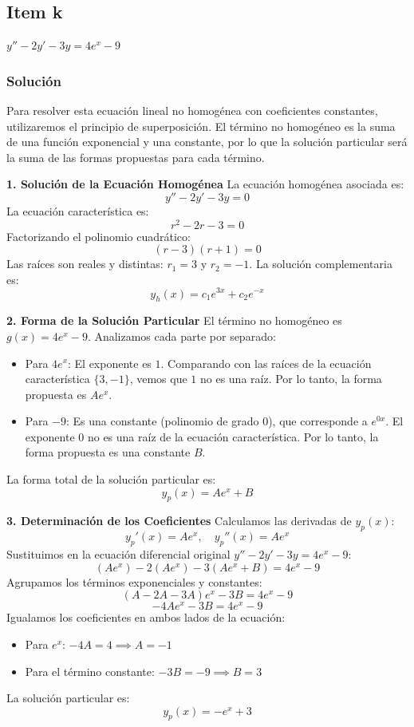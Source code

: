 \documentclass[a4paper]{article}
\begin{document}
\subsection{Item k}
$y'' - 2y' - 3y = 4e^x - 9$

\subsubsection{Solución}
Para resolver esta ecuación lineal no homogénea con coeficientes constantes, utilizaremos el principio de superposición. El término no homogéneo es la suma de una función exponencial y una constante, por lo que la solución particular será la suma de las formas propuestas para cada término.

\textbf{1. Solución de la Ecuación Homogénea}
La ecuación homogénea asociada es:
$$
y'' - 2y' - 3y = 0
$$
La ecuación característica es:
$$
r^2 - 2r - 3 = 0
$$
Factorizando el polinomio cuadrático:
$$
(r - 3)(r + 1) = 0
$$
Las raíces son reales y distintas: $r_1 = 3$ y $r_2 = -1$. La solución complementaria es:
$$
y_h(x) = c_1 e^{3x} + c_2 e^{-x}
$$

\textbf{2. Forma de la Solución Particular}
El término no homogéneo es $g(x) = 4e^x - 9$. Analizamos cada parte por separado:
\begin{itemize}
    \item Para $4e^x$: El exponente es $1$. Comparando con las raíces de la ecuación característica $\{3, -1\}$, vemos que $1$ no es una raíz. Por lo tanto, la forma propuesta es $A e^x$.
    \item Para $-9$: Es una constante (polinomio de grado 0), que corresponde a $e^{0x}$. El exponente $0$ no es una raíz de la ecuación característica. Por lo tanto, la forma propuesta es una constante $B$.
\end{itemize}
La forma total de la solución particular es:
$$
y_p(x) = A e^x + B
$$

\textbf{3. Determinación de los Coeficientes}
Calculamos las derivadas de $y_p(x)$:
$$
y_p'(x) = A e^x, \quad y_p''(x) = A e^x
$$
Sustituimos en la ecuación diferencial original $y'' - 2y' - 3y = 4e^x - 9$:
$$
(A e^x) - 2(A e^x) - 3(A e^x + B) = 4e^x - 9
$$
Agrupamos los términos exponenciales y constantes:
$$
(A - 2A - 3A) e^x - 3B = 4e^x - 9
$$
$$
-4A e^x - 3B = 4e^x - 9
$$
Igualamos los coeficientes en ambos lados de la ecuación:
\begin{itemize}
    \item Para $e^x$: $-4A = 4 \implies A = -1$
    \item Para el término constante: $-3B = -9 \implies B = 3$
\end{itemize}
La solución particular es:
$$
y_p(x) = -e^x + 3
$$
\end{document}
